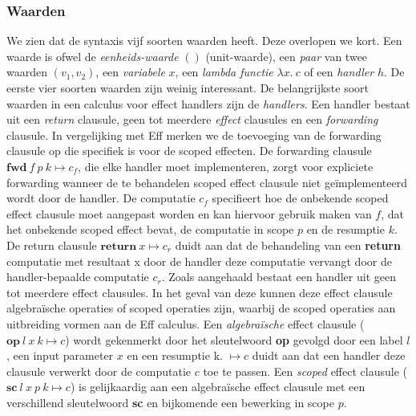 \subsubsection{Waarden}
We zien dat de syntaxis vijf soorten waarden heeft. Deze overlopen we kort.
Een waarde is ofwel de \emph{eenheids-waarde} $()$ (unit-waarde), een \emph{paar} van twee waarden $(v_{1}, v_{2})$, een \emph{variabele} $x$, een \emph{lambda functie} $\lambda x.\:c$ of een \emph{handler} $h$. De eerste vier soorten waarden zijn weinig interessant. \newline
De belangrijkste soort waarden in een calculus voor effect handlers zijn de \emph{handlers}. Een handler bestaat uit een \emph{return} clausule, geen tot meerdere \emph{effect} clausules en een \emph{forwarding} clausule. In vergelijking met Eff merken we de toevoeging van de forwarding clausule op die specifiek is voor de scoped effecten. \newline 
De forwarding clausule $\textbf{fwd}\:f\:p\:k \mapsto c_{f}$, die elke handler moet implementeren, zorgt voor expliciete forwarding wanneer de te behandelen scoped effect clausule niet geïmplementeerd wordt door de handler. De computatie $c_{f}$ specifieert hoe de onbekende scoped effect clausule moet aangepast worden en kan hiervoor gebruik maken van $f$, dat het onbekende scoped effect bevat, de computatie in scope $p$ en de resumptie $k$. \newline
De return clausule $\textbf{return}\:x \mapsto c_{r}$ duidt aan dat de behandeling van een \textbf{return} computatie met resultaat x door de handler deze computatie vervangt door de handler-bepaalde computatie $c_{r}$. \newline
Zoals aangehaald bestaat een handler uit geen tot meerdere effect clausules. In het geval van deze kunnen deze effect clausule algebraïsche operaties of scoped operaties zijn, waarbij de scoped operaties aan uitbreiding vormen aan de Eff calculus. Een \emph{algebraïsche} effect clausule ($\textbf{op}\:l\:x\:k \mapsto c$) wordt gekenmerkt door het sleutelwoord \textbf{op} gevolgd door een label $l$, een input parameter $x$ en een resumptie k. $\mapsto c$ duidt aan dat een handler deze clausule verwerkt door de computatie $c$ toe te passen. Een \emph{scoped} effect clausule ($\textbf{sc}\:l\:x\:p\:k \mapsto c$) is gelijkaardig aan een algebraïsche effect clausule met een verschillend sleutelwoord \textbf{sc} en bijkomende een bewerking in scope $p$.

